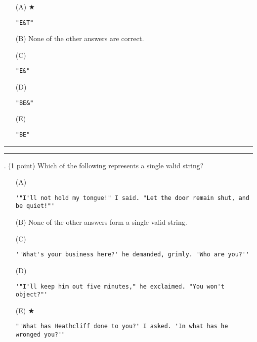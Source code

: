\documentclass{article}
\begin{document}
\begin{enumerate}
\item[(A)] $\bigstar$ 
\begin{verbatim}"E&T"\end{verbatim}

\item[(B)]
None of the other answers are correct.

\item[(C)]
\begin{verbatim}"E&"\end{verbatim}

\item[(D)]
\begin{verbatim}"BE&"\end{verbatim}

\item[(E)]
\begin{verbatim}"BE"\end{verbatim}

\end{enumerate}

\vspace*{2em}
\hrule
\vspace{2em}

\vspace{2em}
\hrule height 2pt


\newpage
{}. (1 point)
Which of the following represents a single valid string?


\begin{enumerate}
\item[(A)]
\begin{verbatim}'"I'll not hold my tongue!" I said. "Let the door remain shut, and be quiet!"'\end{verbatim}

\item[(B)]
None of the other answers form a single valid string.

\item[(C)]
\begin{verbatim}''What's your business here?' he demanded, grimly. 'Who are you?''\end{verbatim}

\item[(D)]
\begin{verbatim}'"I'll keep him out five minutes," he exclaimed. "You won't object?"'\end{verbatim}

\item[(E)] $\bigstar$ 
\begin{verbatim}"'What has Heathcliff done to you?' I asked. 'In what has he wronged you?'"\end{verbatim}

\end{enumerate}
\end{document}
